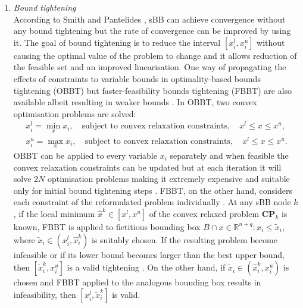 \begin{enumerate}
	\item \emph{Bound tightening}\\
	According to Smith and Pantelides \cite{Smith:1999aa}, sBB can  achieve convergence without any bound tightening but the rate of convergence can be improved by using it. The goal of bound tightening is to reduce the interval $[x_i^l, x_i^u]$ without causing the optimal value of the problem to change and it allows reduction of the feasible set and an improved linearisation. One way of propagating the effects of constraints to variable bounds in optimality-based bounds tightening (OBBT) \cite{Liberti:2006aa,Quesada:1995aa,Smith:1996aa} but faster-feasibility bounds tightening (FBBT) are also available albeit resulting in weaker bounds \cite{Liberti:2006aa,Smith:1996aa,Shectman:1998aa,Sahinidis:2003aa}. In OBBT, two convex optimisation problems are solved:
	\begin{align}
		x_i^l = \min_x x_i, \quad \text{subject to convex relaxation constraints}, \quad x^l \leq x \leq x^u, \\
		x_i^u = \max_x x_i, \quad \text{subject to convex relaxation constraints}, \quad x^l \leq x \leq x^u.
	\end{align}
OBBT can be applied to every variable $x_i$ separately and when feasible the convex relaxation constraints can be updated but at each iteration it will solve $2N$ optimisation problems making it extremely expensive and suitable only for initial bound tightening steps \cite{Smith:1999aa}. FBBT, on the other hand, considers each constraint of the  reformulated problem individually \cite{Shectman:1998aa}. At any sBB node $k$, if the local minimum $\hat{x}^k \in \left[x^l, x^u\right]$ of the convex relaxed problem $\mathbf{CP}_k$ is known, FBBT is applied to fictitious bounding box $B \cap {x \in \mathbb{R}^{n+q} : x_i \leq \tilde{x}_i}$, where $\tilde{x}_i \in \left(x_i^l, \hat{x}_i^k\right)$ is suitably chosen. If the resulting problem become infeasible or if its lower bound becomes larger than the best upper bound, then $\left[\tilde{x}_i^k, x_i^u\right]$ is a valid tightening . On the other hand, if $\tilde{x}_i \in \left(\hat{x}_i^k, x_i^u\right)$ is chosen and FBBT applied to the analogous bounding box results in infeasibility, then $\left[x_i^l, \tilde{x}_i^k\right]$ is valid.
	

\end{enumerate}
